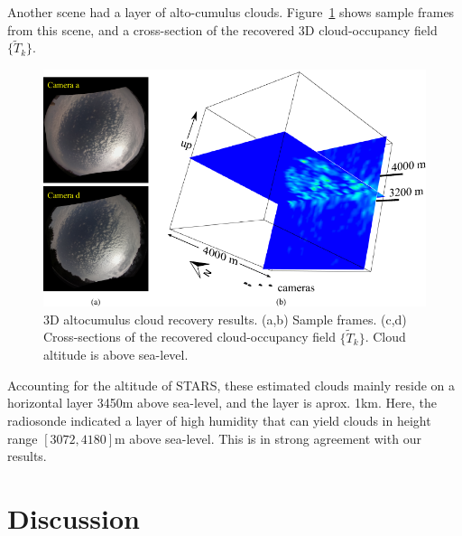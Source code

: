 \documentclass[runningheads]{llncs}
\begin{document}
Another scene had a layer of alto-cumulus clouds. Figure~\ref{fig:alto} shows sample frames from this scene, and a cross-section of the recovered 3D cloud-occupancy field $\{\tilde T_k\}$.
\begin{figure}[t!]
\begin{center}
   \includegraphics[width=1\linewidth]{figures/altos_reconstructions.pdf}
\end{center}
   \vspace{-0.6cm}
   \caption{3D altocumulus cloud recovery results. (a,b) Sample frames.
   (c,d)  Cross-sections of the recovered cloud-occupancy field $\{\tilde T_k\}$. Cloud
   altitude is above sea-level.}
\label{fig:alto}
\end{figure}
Accounting for the altitude of STARS, these estimated clouds mainly reside on a horizontal layer 3450m above sea-level, and the layer is aprox. 1km. Here, the radiosonde indicated a layer of high humidity that can yield clouds in height range $[3072,4180]$m above sea-level. This is in strong agreement with our results.





%

\section{Discussion}
\label{sec:discuss}
\end{document}
